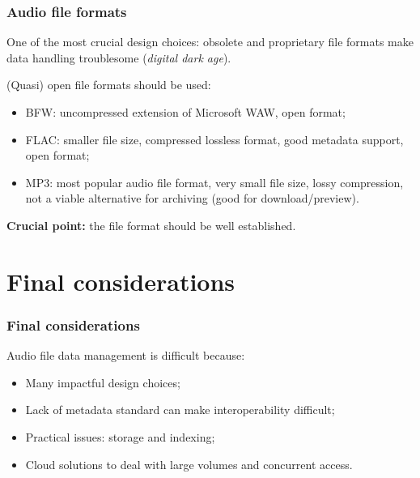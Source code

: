 \documentclass{beamer}
\newcommand\rb[1]{\textcolor{ThemeRed}{\textbf{#1}}}
\begin{document}
  

  \begin{frame}
    \frametitle{Audio file formats}
    
    One of the most crucial design choices: obsolete and proprietary file formats make data handling troublesome (\textit{digital dark age}).

    \vspace{1em}

    (Quasi) open file formats should be used:

    \vspace{0.5em}

    \begin{itemize}
      \itemsep0.5em
      \item BFW: uncompressed extension of Microsoft WAW, open format;
      \item FLAC: smaller file size, compressed lossless format, good metadata support, open format;
      \item MP3: most popular audio file format, very small file size, lossy compression, not a viable alternative for archiving (good for download/preview).
    \end{itemize}

    \vspace{1em}

    \rb{Crucial point:} the file format should be well established.

  \end{frame}

  

\section{Final considerations}

  \begin{frame}
    \frametitle{Final considerations}
    
    Audio file data management is difficult because:
    
    \vspace{1em}
    
    \begin{itemize}
      \itemsep1em
      \item Many impactful design choices;
      \item Lack of metadata standard can make interoperability difficult;
      \item Practical issues: storage and indexing;
      \item Cloud solutions to deal with large volumes and concurrent access.
    \end{itemize}

  \end{frame}


\end{document}
